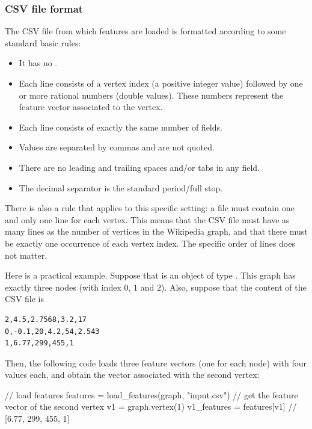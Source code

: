             \subsubsection{CSV file format}
                The CSV file from which features are loaded is formatted according to some standard basic rules:
                \begin{itemize}
                    \item It has no .
                    \item Each line consists of a vertex index (a positive integer value) followed by one or more rational numbers (double values). These numbers represent the feature vector associated to the vertex.
                    \item Each line consists of exactly the same number of fields.
                    \item Values are separated by commas and are not quoted.
                    \item There are no leading and trailing spaces and/or tabs in any field.
                    \item The decimal separator is the standard period/full stop.
                \end{itemize}
                
                There is also a rule that applies to this specific setting: a file must contain one and only one line for each vertex. This means that the CSV file must have as many lines as the number of vertices in the Wikipedia graph, and that there must be exactly one occurrence of each vertex index. The specific order of lines does not matter.
                
                Here is a practical example. Suppose that  is an object of type . This graph has exactly three nodes (with index \(0\), \(1\) and \(2\)). Also, suppose that the content of the CSV file  is
                \begin{lstlisting}
2,4.5,2.7568,3.2,17
0,-0.1,20,4.2,54,2.543
1,6.77,299,455,1
                \end{lstlisting}
                Then, the following code loads three feature vectors (one for each node) with four values each, and obtain the vector associated with the second vertex:
                \begin{example}
// load features
features = load_features(graph, "input.csv")
// get the feature vector of the second vertex
v1 = graph.vertex(1)
v1_features = features[v1] // [6.77, 299, 455, 1]
                \end{example}
